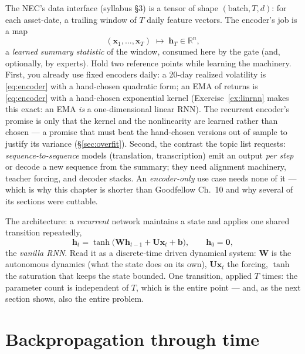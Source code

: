 \documentclass[11pt]{article}
\numberwithin{equation}{section}
\theoremstyle{plain}
\theoremstyle{definition}
\theoremstyle{remark}
\newcommand{\R}{\mathbb{R}}
\newcommand{\x}{\bm{x}}
\newcommand{\bh}{\bm{h}}
\newcommand{\bW}{\bm{W}}
\newcommand{\bU}{\bm{U}}
\begin{document}
The NEC's data interface (syllabus \S3) is a tensor of shape $(\text{batch}, T, d)$: for each asset-date, a trailing window of $T$ daily feature vectors. The encoder's job is a map
\begin{equation}
(\x_{1}, \dots, \x_{T}) \;\longmapsto\; \bh_T \in \R^{n},
\label{eq:encoder}
\end{equation}
a \emph{learned summary statistic} of the window, consumed here by the gate (and, optionally, by experts). Hold two reference points while learning the machinery. First, you already use fixed encoders daily: a 20-day realized volatility is \eqref{eq:encoder} with a hand-chosen quadratic form; an EMA of returns is \eqref{eq:encoder} with a hand-chosen exponential kernel (Exercise~\ref{ex:linrnn} makes this exact: an EMA \emph{is} a one-dimensional linear RNN). The recurrent encoder's promise is only that the kernel and the nonlinearity are learned rather than chosen --- a promise that must beat the hand-chosen versions out of sample to justify its variance (\S\ref{sec:overfit}). Second, the contrast the topic list requests: \emph{sequence-to-sequence} models (translation, transcription) emit an output \emph{per step} or decode a new sequence from the summary; they need alignment machinery, teacher forcing, and decoder stacks. An \emph{encoder-only} use case needs none of it --- which is why this chapter is shorter than Goodfellow Ch.\ 10 and why several of its sections were cuttable.

The architecture: a \emph{recurrent} network maintains a state and applies one shared transition repeatedly,
\begin{equation}
\bh_t = \tanh\big( \bW \bh_{t-1} + \bU \x_t + \bm{b} \big),
\qquad \bh_0 = \bm 0,
\label{eq:rnn}
\end{equation}
the \emph{vanilla RNN}. Read it as a discrete-time driven dynamical system: $\bW$ is the autonomous dynamics (what the state does on its own), $\bU\x_t$ the forcing, $\tanh$ the saturation that keeps the state bounded. One transition, applied $T$ times: the parameter count is independent of $T$, which is the entire point --- and, as the next section shows, also the entire problem.

\section{Backpropagation through time}\label{sec:bptt}
\end{document}
